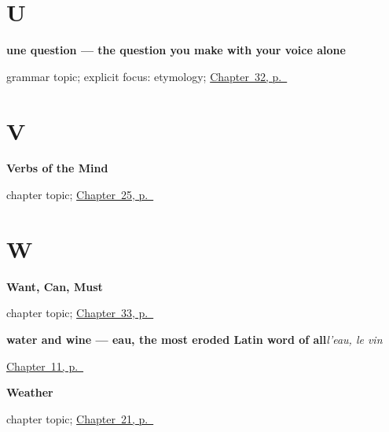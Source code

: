 \section*{U}

\noindent\begin{minipage}[t]{\linewidth}
\raggedright
\textbf{une question — the question you make with your voice alone}\par
\footnotesize grammar topic; explicit focus: etymology; \hyperref[ch:fr-questions]{Chapter~32, p.~\pageref*{ch:fr-questions}}
\end{minipage}\par\smallskip

\section*{V}

\noindent\begin{minipage}[t]{\linewidth}
\raggedright
\textbf{Verbs of the Mind}\par
\footnotesize chapter topic; \hyperref[ch:fr-verbs-of-the-mind]{Chapter~25, p.~\pageref*{ch:fr-verbs-of-the-mind}}
\end{minipage}\par\smallskip

\section*{W}

\noindent\begin{minipage}[t]{\linewidth}
\raggedright
\textbf{Want, Can, Must}\par
\footnotesize chapter topic; \hyperref[ch:fr-modaux]{Chapter~33, p.~\pageref*{ch:fr-modaux}}
\end{minipage}\par\smallskip

\noindent\begin{minipage}[t]{\linewidth}
\raggedright
\textbf{water and wine — eau, the most eroded Latin word of all}\enspace\emph{l'eau, le vin}\par
\footnotesize \hyperref[ch:food]{Chapter~11, p.~\pageref*{ch:food}}
\end{minipage}\par\smallskip

\noindent\begin{minipage}[t]{\linewidth}
\raggedright
\textbf{Weather}\par
\footnotesize chapter topic; \hyperref[ch:fr-weather]{Chapter~21, p.~\pageref*{ch:fr-weather}}
\end{minipage}\par\smallskip


